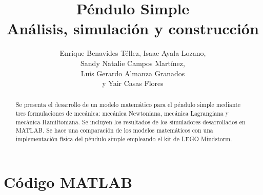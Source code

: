 \documentclass[letterpaper, 12pt]{article}
\begin{document}
\title{
Péndulo Simple\\
Análisis, simulación y construcción\\
}


\author{
    Enrique Benavides Téllez, Isaac Ayala Lozano,\\ 
    Sandy Natalie Campos Martínez,\\
    Luis Gerardo Almanza Granados\\
    y Yair Casas Flores
}

\date{}

\maketitle

\begin{abstract}



Se presenta el desarrollo de un modelo matemático
para el péndulo simple mediante tres formulaciones de mecánica: 
mecánica Newtoniana, mecánica Lagrangiana y mecánica Hamiltoniana.
Se incluyen los resultados de los simuladores desarrollados 
en MATLAB.
Se hace una comparación de los modelos matemáticos 
con una implementación física del péndulo simple empleando el 
kit de LEGO Mindstorm.

\end{abstract}








% 



\clearpage
% 
\printbibliography{}

\pagebreak

\appendix
\section{Código MATLAB}


% 
\end{document}
